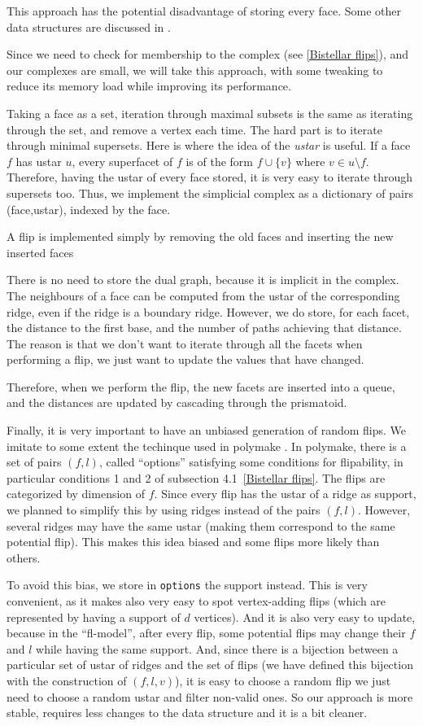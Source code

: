 \documentclass[12pt,a4paper]{article}
\theoremstyle{plain}
\theoremstyle{definition}
\begin{document}
This approach has the potential disadvantage of storing every face. Some other data structures are discussed in \cite{data structure}.

Since we need to check for membership to the complex (see \ref{Bistellar flips}), and our complexes are small, we will take this approach, with some tweaking to reduce its memory load while improving its performance.

Taking a face as a set, iteration through maximal subsets is the same as iterating through the set, and remove a vertex each time. The hard part is to iterate through minimal supersets.
%
Here is where the idea of the \emph{ustar} is useful. If a face $f$ has ustar $u$, every superfacet of $f$ is of the form $f\cup\{v\}$ where $v\in u\setminus f$. Therefore, having the ustar of every face stored, it is very easy to iterate through supersets too.
%
Thus, we implement the simplicial complex as a dictionary of pairs (face,ustar), indexed by the face.

A flip is implemented simply by removing the old faces and inserting the new inserted faces

There is no need to store the dual graph, because it is implicit in the complex. The neighbours of a face can be computed from the ustar of the corresponding ridge, even if the ridge is a boundary ridge. However, we do store, for each facet, the distance to the first base, and the number of paths achieving that distance. The reason is that we don't want to iterate through all the facets when performing a flip, we just want to update the values that have changed.

Therefore, when we perform the flip, the new facets are inserted into a queue, and the distances are updated by cascading through the prismatoid.

Finally, it is very important to have an unbiased generation of random flips. We imitate to some extent the techinque used in polymake \cite{polymake}. In polymake, there is a set of pairs $(f,l)$, called ``options'' satisfying some conditions for flipability, in particular conditions 1 and 2 of subsection 4.1~\ref{Bistellar flips}. The flips are categorized by dimension of $f$.
%
Since every flip has the ustar of a ridge as support, we planned to simplify this by using ridges instead of the pairs $(f,l)$. However, several ridges may have the same ustar (making them correspond to the same potential flip). This makes this idea biased and some flips more likely than others.

To avoid this bias, we store in \lstinline{options} the support instead. This is very convenient, as it makes also very easy to spot vertex-adding flips (which are represented by having a support of $d$ vertices). And it is also very easy to update, because in the ``fl-model'', after every flip, some potential flips may change their $f$ and $l$ while having the same support. And, since there is a bijection between a particular set of ustar of ridges and the set of flips (we have defined this bijection with the construction of $(f,l,v)$), it is easy to choose a random flip we just need to choose a random ustar and filter non-valid ones. So our approach is more stable, requires less changes to the data structure and it is a bit cleaner.
\end{document}
